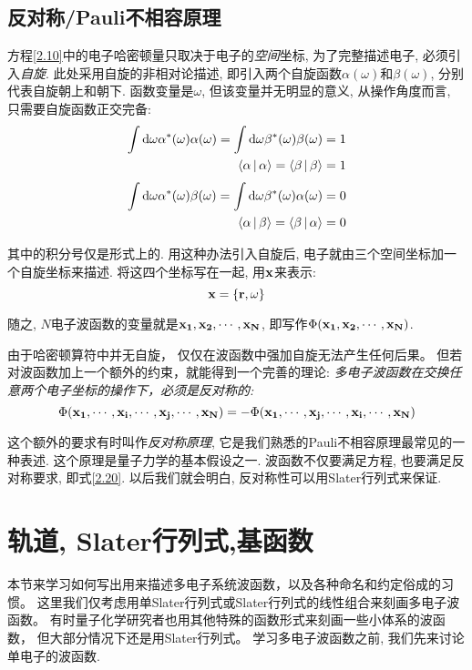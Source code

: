 \subsection{反对称/Pauli不相容原理}
\label{sec2.1.3}
方程\ref{2.10}中的电子哈密顿量只取决于电子的\emph{空间}坐标, 
为了完整描述电子, 
必须引入\emph{自旋}. 
此处采用自旋的非相对论描述, 
即引入两个自旋函数$\alpha(\omega)$和$\beta(\omega)$, 
分别代表自旋朝上和朝下. 
函数变量是$\omega$, 
但该变量并无明显的意义, 
从操作角度而言, 
只需要自旋函数正交完备:
\begin{subequations}
	\begin{align}
\int\dd\omega\alpha^*(\omega)\alpha(\omega)=\int\dd\omega\beta^*(\omega)\beta(\omega)=1\\
\braket{\alpha|\alpha}=\braket{\beta|\beta}=1
	\end{align}
\end{subequations}
\begin{subequations}
	\begin{align}
	\int\dd\omega\alpha^*(\omega)\beta(\omega)=\int\dd\omega\beta^*(\omega)\alpha(\omega)=0\\
	\braket{\alpha|\beta}=\braket{\beta|\alpha}=0
	\end{align}
\end{subequations}
\label{2.20}

其中的积分号仅是形式上的. 
用这种办法引入自旋后, 
电子就由三个空间坐标加一个自旋坐标来描述. 
将这四个坐标写在一起,
用$\mathbf{x}$来表示:
 \begin{equation}
 \label{2.21}
 \mathbf{x}=\{\mathbf{r},\omega\}
 \end{equation}

 随之, $N$电子波函数的变量就是$ \mathbf{x_1,x_2,\cdots ,x_N} $, 即写作$\Phi(\mathbf{x_1,x_2,\cdots ,x_N})$.
 
由于哈密顿算符中并无自旋，
仅仅在波函数中强加自旋无法产生任何后果。
但若对波函数加上一个额外的约束，就能得到一个完善的理论: 
\emph{
	多电子波函数在交换任意两个电子坐标的操作下，必须是反对称的:
}
\begin{equation}
\label{2.22}
\Phi(\mathbf{x_1,\cdots,x_i,\cdots,x_j,\cdots ,x_N})=-\Phi(\mathbf{x_1,\cdots,x_j,\cdots,x_i,\cdots ,x_N})
\end{equation}

这个额外的要求有时叫作\emph{反对称原理}, 
它是我们熟悉的Pauli不相容原理最常见的一种表述. 
这个原理是量子力学的基本假设之一. 
波函数不仅要满足\sch 方程, 
也要满足反对称要求, 即式\ref{2.20}. 
以后我们就会明白, 反对称性可以用Slater行列式来保证.
 
\section{轨道, Slater行列式,基函数}
\label{sec2.2}
本节来学习如何写出用来描述多电子系统波函数，以及各种命名和约定俗成的习惯。
这里我们仅考虑用单Slater行列式或Slater行列式的线性组合来刻画多电子波函数。
有时量子化学研究者也用其他特殊的函数形式来刻画一些小体系的波函数，
但大部分情况下还是用Slater行列式。
学习多电子波函数之前, 我们先来讨论单电子的波函数.
 

